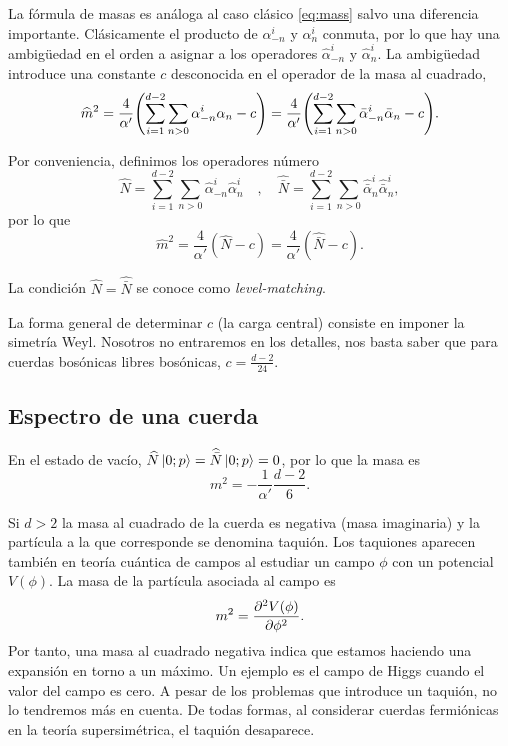La fórmula de masas es análoga al caso clásico \ref{eq:mass} salvo una diferencia importante.
Clásicamente el producto de $\alpha^i_{-n}$ y $\alpha^i_n$ conmuta, por lo que hay una 
ambigüedad en el orden a asignar a los operadores $\widehat\alpha^i_{-n}$ y $\widehat \alpha^i_n$.
La ambigüedad introduce una constante $c$ desconocida en el operador de la masa al cuadrado,
\begin{equation}
  \widehat m^2 = \frac{4}{\alpha'}\qty(\sum_{i=1}^{d-2} \sum_{n>0} \alpha_{-n}^i\alpha_n -c)
   = \frac{4}{\alpha'}\qty(\sum_{i=1}^{d-2} \sum_{n>0} \bar \alpha_{-n}^i\bar \alpha_n -c).
\end{equation}

Por conveniencia, definimos los operadores número
\begin{equation}
  \widehat N=\sum_{i=1}^{d-2} \sum_{n>0}\widehat \alpha_{-n}^i\widehat\alpha_n^i \quad , \quad   
  \widehat {\bar N}=\sum_{i=1}^{d-2} \sum_{n>0} \widehat{\bar \alpha}_n^i\widehat{ \bar\alpha}_n^i, 
\end{equation}
por lo que 
\begin{equation}
  \widehat m^2 = \frac{4}{\alpha'} (\widehat N -c ) = \frac{4}{\alpha'} (\widehat{\bar N} -c).
  \label{eq:massdef}
\end{equation}

La condición $\widehat N=\widehat {\bar N}$ se conoce como \emph{level-matching}.

La forma general de determinar $c$ (la carga central) consiste en imponer la simetría Weyl.
Nosotros no entraremos en los detalles, nos basta saber que para cuerdas bosónicas libres
bosónicas, $c=\frac{d-2}{24}$.


\subsection{Espectro de una cuerda}
En el estado de vacío, $\widehat N\ket{0;p}=\widehat {\bar N}\ket{0;p}=0$, por lo que la masa es
\begin{equation}
  m^2 = -\frac{1}{\alpha'}\frac{d-2}{6}.
\end{equation}

Si $d>2$ la masa al cuadrado de la cuerda es negativa (masa imaginaria) y la partícula a la que corresponde se denomina taquión.
Los taquiones aparecen también en teoría cuántica de campos al estudiar un campo $\phi$ con un 
potencial $V(\phi)$.
La masa de la partícula asociada al campo es
\begin{equation}
  m^2 = \pdv[2]{V(\phi)}{\phi}.
\end{equation}
Por tanto, una masa al cuadrado negativa indica que estamos haciendo una expansión en torno
a un máximo. 
Un ejemplo es el campo de Higgs cuando el valor del campo es cero.
A pesar de los problemas que introduce un taquión, no lo tendremos más en cuenta. 
De todas formas, al considerar cuerdas fermiónicas en la teoría supersimétrica, el taquión
desaparece.

